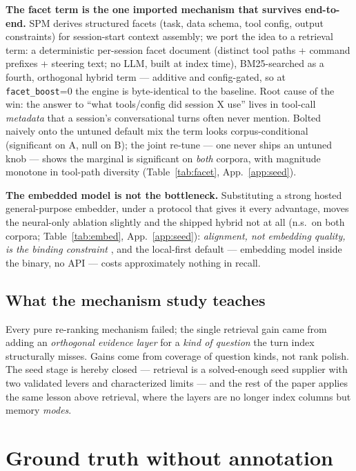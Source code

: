 \documentclass[twocolumn,10pt]{article}
\newcommand{\code}[1]{\texttt{#1}}
\begin{document}
\textbf{The facet term is the one imported mechanism that survives end-to-end.} SPM \citep{spm2026} derives structured facets (task, data schema, tool config, output constraints) for session-start context assembly; we port the idea to a retrieval term: a deterministic per-session facet document (distinct tool paths + command prefixes + steering text; no LLM, built at index time), BM25-searched as a fourth, orthogonal hybrid term --- additive and config-gated, so at \code{facet\_boost}=0 the engine is byte-identical to the baseline. Root cause of the win: the answer to ``what tools/config did session X use'' lives in tool-call \emph{metadata} that a session's conversational turns often never mention. Bolted naively onto the untuned default mix the term looks corpus-conditional (significant on A, null on B); the joint re-tune --- one never ships an untuned knob --- shows the marginal is significant on \emph{both} corpora, with magnitude monotone in tool-path diversity (Table~\ref{tab:facet}, App.~\ref{app:seed}).

\textbf{The embedded model is not the bottleneck.} Substituting a strong hosted general-purpose embedder, under a protocol that gives it every advantage, moves the neural-only ablation slightly and the shipped hybrid not at all (n.s.\ on both corpora; Table~\ref{tab:embed}, App.~\ref{app:seed}): \emph{alignment, not embedding quality, is the binding constraint} \citep{anms2026}, and the local-first default --- embedding model inside the binary, no API --- costs approximately nothing in recall.

\subsection{What the mechanism study teaches}

Every pure re-ranking mechanism failed; the single retrieval gain came from adding an \emph{orthogonal evidence layer} for a \emph{kind of question} the turn index structurally misses. Gains come from coverage of question kinds, not rank polish. The seed stage is hereby closed --- retrieval is a solved-enough seed supplier with two validated levers and characterized limits --- and the rest of the paper applies the same lesson above retrieval, where the layers are no longer index columns but memory \emph{modes}.

\section{Ground truth without annotation}\label{sec:groundtruth}
\end{document}
